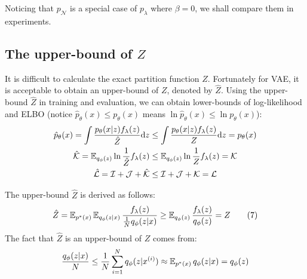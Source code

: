 Noticing that $p_\mathcal{N}$ is a special case of $p_\lambda$ where $\beta = 0$, we shall compare them in experiments.  

\subsection{The upper-bound of $Z$}\label{subsec:determine_z}

It is difficult to calculate the exact partition function $Z$. Fortunately for VAE, it is acceptable to obtain an upper-bound of $Z$, denoted by $\hat{Z}$. Using the upper-bound $\hat{Z}$ in training and evaluation, we can obtain lower-bounds of log-likelihood and ELBO (notice $\hat{p}_\theta(x) \leq p_\theta(x)$ means $\ln \hat{p}_\theta(x) \leq \ln p_\theta(x)$):
\begin{align*}
	\hat{p}_\theta(x) = \int \frac{p_\theta(x|z) f_\lambda(z)}{\hat{Z}}  \mathrm{d} z &\leq \int \frac{p_\theta(x|z) f_\lambda(z)}{Z} \mathrm{d} z = p_\theta(x)  \\
	\mathcal{\hat{K}} = \operatorname{\mathbb{E}}_{q_\phi(z)} \ln \frac{1}{\hat{Z}} f_\lambda(z) &\leq \operatorname{\mathbb{E}}_{q_\phi(z)} \ln \frac{1}{Z}  f_\lambda(z) = \mathcal{K}   \\
    \mathcal{\hat{L}} =  \mathcal{I} + \mathcal{J} + \mathcal{\hat{K}} &\leq \mathcal{I} + \mathcal{J} + \mathcal{K} = \mathcal{L}
\end{align*}

The upper-bound $\hat{Z}$ is derived as follows:
\begin{align*}\label{eq:Z_estimator}
    \hat{Z} = \operatorname{\mathbb{E}}_{p^*(x)}\operatorname{\mathbb{E}}_{q_\phi(z|x)} \frac{f_\lambda(z)}{\frac{1}{N}q_\phi(z|x)} \geq
	\operatorname{\mathbb{E}}_{q_\phi(z)}\frac{f_\lambda(z)}{q_\phi(z)} = Z \tag{7}
\end{align*}
The fact that $\hat{Z}$ is an upper-bound of $Z$ comes from:
\begin{equation*}
	\frac{q_\phi(z|x)}{N} \leq \frac{1}{N}\sum_{i=1}^N q_\phi(z|x^{(i)}) \approx \operatorname{\mathbb{E}}_{p^*(x)}q_\phi(z|x) = q_\phi(z)
\end{equation*}

